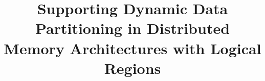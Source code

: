 \documentclass[9pt,nocopyrightspace,preprint]{sigplanconf}
\begin{document}
\title{Supporting Dynamic Data Partitioning in Distributed Memory Architectures with Logical Regions}
\authorinfo{}{}{}
\maketitle
\end{document}

